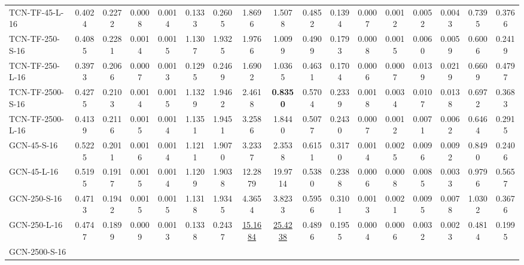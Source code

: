 \begin{table*}[h]
{\begin{tabular}{lcc|cc|cc|cc|cc|cc|cc|cc}
            TCN-TF-45-L-16
                & 0.4024 & 0.2272
                & 0.0008 & 0.0014 & 0.1333 & 0.2605 & 1.8696 & 1.5078 
                & 0.4852 & 0.1394
                & 0.0007 & 0.0012 & 0.0052 & 0.0043 & 0.7395 & 0.3766\\ 
            TCN-TF-250-S-16 
                & 0.4085 & 0.2281
                & 0.0014 & 0.0015 & 1.1307 & 1.9325 & 1.9766 & 1.0099 
                & 0.4909 & 0.1793
                & 0.0008 & 0.0015 & 0.0060 & 0.0059 & 0.6006 & 0.2419\\ 
            TCN-TF-250-L-16 
                & 0.3973 & 0.2066
                & 0.0007 & 0.0013 & 0.1295 & 0.2469 & 1.6902 & 1.0365 
                & 0.4631 & 0.1704
                & 0.0006 & 0.0007 & 0.0139 & 0.0219 & 0.6609 & 0.4797\\ 
            TCN-TF-2500-S-16 
                & 0.4275 & 0.2103
                & 0.0014 & 0.0015 & 1.1329 & 1.9462 & 2.4618 & \textbf{0.8350} 
                & 0.5704 & 0.2339
                & 0.0018 & 0.0034 & 0.0107 & 0.0138 & 0.6972 & 0.3683\\ 
            TCN-TF-2500-L-16 
                & 0.4139 & 0.2116
                & 0.0015 & 0.0014 & 1.1351 & 1.9451 & 3.2586 & 1.8440 
                & 0.5077 & 0.2430
                & 0.0007 & 0.0012 & 0.0071 & 0.0062 & 0.6464 & 0.2915\\ 
            \midrule
            GCN-45-S-16 
                & 0.5225 & 0.2011
                & 0.0016 & 0.0014 & 1.1211 & 1.9070 & 3.2337 & 2.3538 
                & 0.6151 & 0.3170
                & 0.0014 & 0.0025 & 0.0096 & 0.0092 & 0.8490 & 0.2406\\ 
            GCN-45-L-16 
                & 0.5195 & 0.1917
                & 0.0015 & 0.0014 & 1.1209 & 1.9038 & 12.2879 & 19.9714 
                & 0.5380 & 0.2388
                & 0.0006 & 0.0008 & 0.0085 & 0.0033 & 0.9796 & 0.5657\\ 
            GCN-250-S-16 
                & 0.4713 & 0.1942
                & 0.0015 & 0.0015 & 1.1318 & 1.9345 & 4.3654 & 3.8233 
                & 0.5956 & 0.3101
                & 0.0013 & 0.0021 & 0.0095 & 0.0078 & 1.0302 & 0.3676\\ 
            GCN-250-L-16 
                & 0.4747 & 0.1899
                & 0.0009 & 0.0013 & 0.1338 & 0.2437 & \underline{15.1684} & \underline{25.4238} 
                & 0.4896 & 0.1955
                & 0.0004 & 0.0006 & 0.0032 & 0.0023 & 0.4814 & 0.1995\\ 
            GCN-2500-S-16 

\end{tabular}}
\end{table*}
